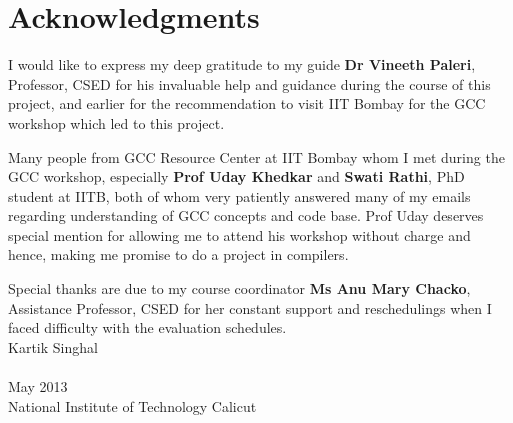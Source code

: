 \cleardoublepage
{}
{}
\chapter*{Acknowledgments}
\vspace{1.0in}
I would like to express my deep gratitude to my guide \textbf{Dr Vineeth Paleri}, Professor, CSED for his invaluable help and guidance during the course of this project, and earlier for the recommendation to visit IIT Bombay for the GCC workshop which led to this project.

Many people from GCC Resource Center at IIT Bombay whom I met during the GCC workshop, especially \textbf{Prof Uday Khedkar} and \textbf{Swati Rathi}, PhD student at IITB, both of whom very patiently answered many of my emails regarding understanding of GCC concepts and code base. Prof Uday deserves special mention for allowing me to attend his workshop without charge and hence, making me promise to do a project in compilers.

Special thanks are due to my course coordinator \textbf{Ms Anu Mary Chacko}, Assistance Professor, CSED for her constant support and reschedulings when I faced difficulty with the evaluation schedules.\\[3.0cm]
Kartik Singhal\\
\\
May 2013\\
{National Institute of Technology Calicut}\\
\newpage
